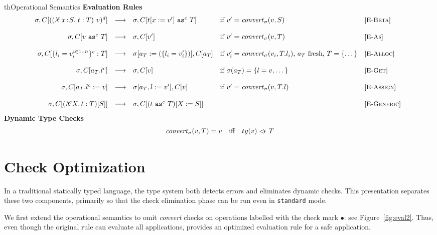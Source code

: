 \documentclass{article}
\newcommand{\myclearpage}{}
\renewcommand{\myclearpage}{\clearpage}
\newcommand{\fun}[1]{\mbox{\it #1\/}}
\newcommand{\safe}{\bullet}
\newcommand{\lam}[5]{\lambda\!^{#1}\,#2\!:\!#3.\,\,#5:#4}
\newcommand{\app}[3]{(#2~#3)^{#1}}
\newcommand{\Lam}[4]{\Lambda\!^{#1} #2.\,#3:#4}
\newcommand{\App}[2]{#1[#2]}
\newcommand{\cast}[3]{#2~\t{as}^{#1}~#3}
\newcommand{\comsubtype}[2]{#1 <\!\!\leadsto #2}
\renewcommand{\comsubtype}[2]{#1 <\!\!\!*\,\, #2}
\newcommand{\convert}[2]{{#1}\convertword{#2}}
\newcommand{\convertword}{\mbox{\,\,$\sim :$\,\,}}
\renewcommand{\t}[1]{{\tt #1}}
\newcommand{\red}[0]{\longrightarrow}  %
\newcommand{\lred}[0]{\red}  %
\newcommand{\objty}[1]{\{#1\}}
\newcommand{\obje}[3]{\{#2\}^{#1}:{#3}}
\newcommand{\objv}[1]{\{#1\}}
\newcommand{\objget}[3]{#2.#3^{#1}}
\newcommand{\objset}[4]{#2.#3^{#1}:=#4}
\newcommand{\allocty}[1]{ty(#1)}
\renewcommand{\convert}[2]{\fun{convert}_{\sigma}(#1,#2)}
\newcommand{\istype}[2]{#1~\t{is}_{\sigma}~ #2}
\begin{document}
\begin{displayfigure}{th}{Operational Semantics}
\label{fig:eval} 
\label{fig:convert} 
\footnotesize
{\bf Evaluation Rules}
\[
\begin{array}{@{}rclll}
	\sigma,C[{\app{d}{(\lam{c}{x}{S}{T}{t})}{v}}]
	&\lred&
	\sigma,C[\cast{c}{t[x:=v']}{T}]
	&\mbox{if $v'=\convert v S$}
	&\rel{E-Beta}
\\~\\
	\sigma,C[\cast{c}{v}{T}]
	&\lred&
	\sigma,C[v']
	&\mbox{if $v'=\convert v T$}
	&\rel{E-As}
\\~\\
	\sigma,C[\obje{c}{l_i=v_i^{i\in 1..n}}{T}]
	&\lred&
	\sigma[a_T:=(\objv{l_i=v'_i})],C[a_T] 
	&\mbox{if $v_i'=\convert{v_i}{T.l_i}$, $a_T$ fresh, $T=\objty{\dots}$}
	&\rel{E-Alloc} 
\\~\\
	\sigma,C[\objget{c}{a_T}{l}]
	&\lred&
	\sigma,C[v]
	&\mbox{if $\sigma(a_T)=\objv{l=v,\dots}$}
	&\rel{E-Get}
\\~\\
	\sigma,C[\objset{c}{a_T}{l}{v}]
	&\lred&
	\sigma[a_T,l:=v'],C[v] 
	&\mbox{if $v'=\convert v {T.l}$}
	&\rel{E-Assign} 
\\~\\
	\sigma,C[{\App{(\Lam c X t T)}{S}}]
	&\lred&
	\sigma,C[(\cast{c}{t}{T})[X:=S]]
	& 
	&\rel{E-Generic}
\end{array}
\]
{\bf Dynamic Type Checks}
\[
\begin{array}{rcl}
	\convert{v}{T} = v &\mbox{iff}&%
	 \mbox{$\comsubtype{\allocty v}{T}$} \\
\end{array}
\]
 \end{displayfigure} 

\myclearpage
\section{Check Optimization}
\label{sec:opt}

In a traditional statically typed language, the type system both detects errors and eliminates dynamic checks.
This presentation separates these two components, primarily so that the check elimination phase 
can be run even in   \t{standard} mode.
 
We first extend the operational semantics to omit \emph{convert} checks on operations labelled with the check mark $\safe$: see Figure~\ref{fig:eval2}. Thus, even though the original rule  can evaluate all applications,  provides an optimized evaluation rule for a safe application.
\end{document}
